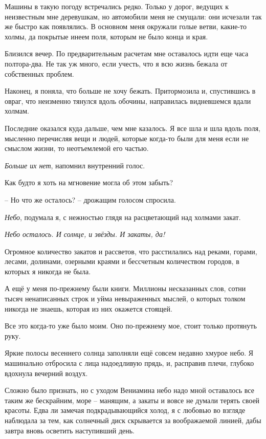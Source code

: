 \documentclass[
]{book}
\begin{document}
Машины в такую погоду встречались редко. Только у дорог, ведущих к неизвестным мне деревушкам, но автомобили меня не смущали: они исчезали так же быстро как появлялись. В основном меня окружали голые ветви, какие-то холмы, да покрытые инеем поля, которым не было конца и края.

Близился вечер. По предварительным расчетам мне оставалось идти еще часа полтора-два. Не так уж много, если учесть, что я всю жизнь бежала от собственных проблем.

Наконец, я поняла, что больше не хочу бежать. Притормозила и, спустившись в овраг, что неизменно тянулся вдоль обочины, направилась видневшемся вдали холмам.

Последние оказался куда дальше, чем мне казалось. Я все шла и шла вдоль поля, мысленно перечисляя вещи и людей, которые когда-то были для меня если не смыслом жизни, то неотъемлемой его частью.

\emph{Больше их нет}, напомнил внутренний голос.

Как будто я хоть на мгновение могла об этом забыть?

-- Но что же осталось? -- дрожащим голосом спросила.

\emph{Небо}, подумала я, с нежностью глядя на расцветающий над холмами закат.

\emph{Небо осталось. И солнце, и звёзды. И закаты, да!}

Огромное количество закатов и рассветов, что расстилались над реками, горами, лесами, долинами, озерными краями и бессчетным количеством городов, в которых я никогда не была.

А ещё у меня по-прежнему были книги. Миллионы несказанных слов, сотни тысяч ненаписанных строк и уйма невыраженных мыслей, о которых толком никогда не знаешь, которая из них окажется стоящей.

Все это когда-то уже было моим. Оно по-прежнему мое, стоит только протянуть руку.

Яркие полосы весеннего солнца заполняли ещё совсем недавно хмурое небо. Я машинально отбросила с лица надоедливую прядь, и, расправив плечи, глубоко вдохнула вечерний воздух.

Сложно было признать, но с уходом Вениамина небо надо мной оставалось все таким же бескрайним, море -- манящим, а закаты и вовсе не думали терять своей красоты. Едва ли замечая подкрадывающийся холод, я с любовью во взгляде наблюдала за тем, как солнечный диск скрывается за воображаемой линией, дабы завтра вновь осветить наступивший день.
\end{document}
